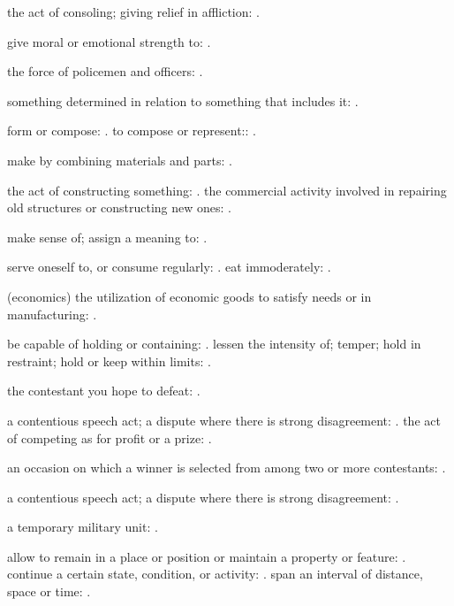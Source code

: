   the act of consoling; giving relief in affliction: .

  give moral or emotional strength to: .

  the force of policemen and officers: .

  something determined in relation to something that includes it: .

  form or compose:   . to compose or represent:: .

  make by combining materials and parts: .

  the act of constructing something: . the commercial activity involved in repairing old structures or constructing new ones: .

  make sense of; assign a meaning to: .

  serve oneself to, or consume regularly: . eat immoderately: .

  (economics) the utilization of economic goods to satisfy needs or in manufacturing: .

  be capable of holding or containing: . lessen the intensity of; temper; hold in restraint; hold or keep within limits: .

  the contestant you hope to defeat: .

  a contentious speech act; a dispute where there is strong disagreement: . the act of competing as for profit or a prize: .

  an occasion on which a winner is selected from among two or more contestants: .

  a contentious speech act; a dispute where there is strong disagreement: .

  a temporary military unit: .

  allow to remain in a place or position or maintain a property or feature: . continue a certain state, condition, or activity: . span an interval of distance, space or time: .

